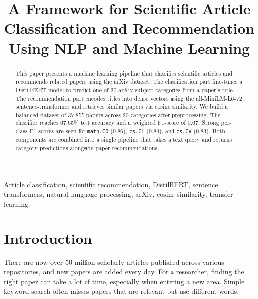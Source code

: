 \documentclass[conference]{IEEEtran}
\begin{document}
\title{A Framework for Scientific Article Classification and Recommendation Using NLP and Machine Learning}

\author{
}

\maketitle

\begin{abstract}
This paper presents a machine learning pipeline that classifies
scientific articles and recommends related papers using the arXiv
dataset.  The classification part fine-tunes a DistilBERT model
to predict one of 20 arXiv subject categories from a paper's title.
The recommendation part encodes titles into dense vectors using the
all-MiniLM-L6-v2 sentence-transformer and retrieves similar papers
via cosine similarity.  We build a balanced dataset of 37,855 papers
across 20 categories after preprocessing.  The classifier reaches
67.65\% test accuracy and a weighted F1-score of 0.67.  Strong
per-class F1-scores are seen for \texttt{math.CO} (0.86),
\texttt{cs.CL} (0.84), and \texttt{cs.CV} (0.83).  Both components
are combined into a single pipeline that takes a text query and
returns category predictions alongside paper recommendations.
\end{abstract}

\begin{IEEEkeywords}
Article classification, scientific recommendation, DistilBERT,
sentence transformers, natural language processing, arXiv,
cosine similarity, transfer learning
\end{IEEEkeywords}

\section{Introduction}

There are now over 50 million scholarly articles published across
various repositories, and new papers are added every day.  For a
researcher, finding the right paper can take a lot of time,
especially when entering a new area.  Simple keyword search often
misses papers that are relevant but use different words.
\end{document}
